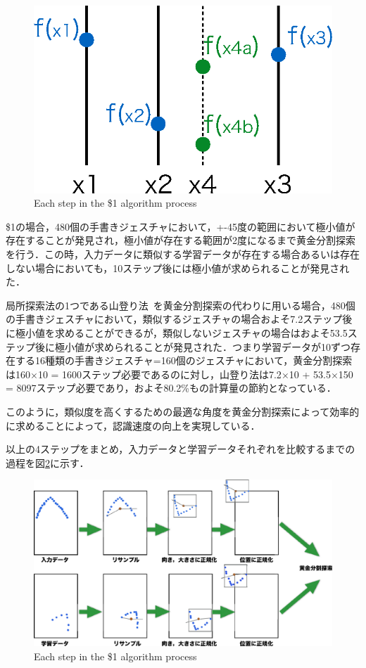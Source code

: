 \begin{figure} [!h]
\centering
\includegraphics [width=0.8\columnwidth]{img/golden.eps}
\caption{Each step in the \$1 algorithm process}
\label{fig:golden}
\end{figure}

\$1の場合，480個の手書きジェスチャにおいて，+-45度の範囲において極小値が存在することが発見され，極小値が存在する範囲が2度になるまで黄金分割探索を行う．この時，入力データに類似する学習データが存在する場合あるいは存在しない場合においても，10ステップ後には極小値が求められることが発見された．

局所探索法の1つである山登り法~\cite{Park:2009:SFA:1464526.1465112,Department94prototypeand}を黄金分割探索の代わりに用いる場合，480個の手書きジェスチャにおいて，類似するジェスチャの場合およそ7.2ステップ後に極小値を求めることができるが，類似しないジェスチャの場合はおよそ53.5ステップ後に極小値が求められることが発見された．つまり学習データが10ずつ存在する16種類の手書きジェスチャ=160個のジェスチャにおいて，黄金分割探索は160$\times$10 = 1600ステップ必要であるのに対し，山登り法は7.2$\times$10 + 53.5$\times$150 = 8097ステップ必要であり，およそ80.2\%もの計算量の節約となっている．

このように，類似度を高くするための最適な角度を黄金分割探索によって効率的に求めることによって，認識速度の向上を実現している．

以上の4ステップをまとめ，入力データと学習データそれぞれを比較するまでの過程を図\ref{fig:onedoller_flow}に示す．
\begin{figure} [!h]
\centering
\includegraphics [width=0.8\columnwidth]{img/onedoller_flow.eps}
\caption{Each step in the \$1 algorithm process}
\label{fig:onedoller_flow}
\end{figure}

